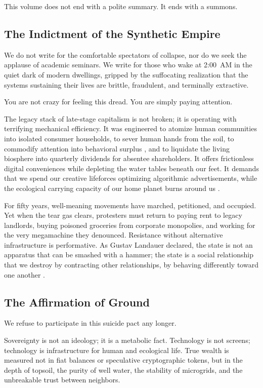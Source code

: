 This volume does not end with a polite summary. It ends with a summons.

\subsection{The Indictment of the Synthetic Empire}
\label{subsec:indictment}

We do not write for the comfortable spectators of collapse, nor do we seek the applause of academic seminars. We write for those who wake at 2:00~AM in the quiet dark of modern dwellings, gripped by the suffocating realization that the systems sustaining their lives are brittle, fraudulent, and terminally extractive.

You are not crazy for feeling this dread. You are simply paying attention.

The legacy stack of late-stage capitalism is not broken; it is operating with terrifying mechanical efficiency. It was engineered to atomize human communities into isolated consumer households, to sever human hands from the soil, to commodify attention into behavioral surplus \parencite{zuboff2019}, and to liquidate the living biosphere into quarterly dividends for absentee shareholders. It offers frictionless digital conveniences while depleting the water tables beneath our feet. It demands that we spend our creative lifeforces optimizing algorithmic advertisements, while the ecological carrying capacity of our home planet burns around us \parencite{rockstrom2009safe}.

For fifty years, well-meaning movements have marched, petitioned, and occupied. Yet when the tear gas clears, protesters must return to paying rent to legacy landlords, buying poisoned groceries from corporate monopolies, and working for the very megamachine they denounced. Resistance without alternative infrastructure is performative. As Gustav Landauer declared, the state is not an apparatus that can be smashed with a hammer; the state is a social relationship that we destroy by contracting other relationships, by behaving differently toward one another \parencite{landauer2010}.

\subsection{The Affirmation of Ground}
\label{subsec:affirmation_ground}

We refuse to participate in this suicide pact any longer.

Sovereignty is not an ideology; it is a metabolic fact. Technology is not screens; technology is infrastructure for human and ecological life. True wealth is measured not in fiat balances or speculative cryptographic tokens, but in the depth of topsoil, the purity of well water, the stability of microgrids, and the unbreakable trust between neighbors.

